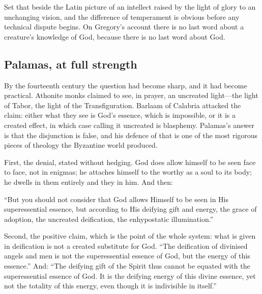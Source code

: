 Set that beside the Latin picture of an intellect raised by the light of glory to an unchanging vision, and the difference of temperament is obvious before any technical dispute begins. On Gregory's account there is no last word about a creature's knowledge of God, because there is no last word about God.

\subsection{Palamas, at full strength}

By the fourteenth century the question had become sharp, and it had become practical. Athonite monks claimed to see, in prayer, an uncreated light---the light of Tabor, the light of the Transfiguration. Barlaam of Calabria attacked the claim: either what they see is God's essence, which is impossible, or it is a created effect, in which case calling it uncreated is blasphemy. Palamas's answer is that the disjunction is false, and his defence of that is one of the most rigorous pieces of theology the Byzantine world produced.

First, the denial, stated without hedging. God does allow himself to be seen face to face, not in enigmas; he attaches himself to the worthy as a soul to its body; he dwells in them entirely and they in him. And then:

\begin{studyframe}
``But you should not consider that God allows Himself to be seen in His superessential essence, but according to His deifying gift and energy, the grace of adoption, the uncreated deification, the enhypostatic illumination.''
\end{studyframe}

Second, the positive claim, which is the point of the whole system: what is given in deification is not a created substitute for God. ``The deification of divinised angels and men is not the superessential essence of God, but the energy of this essence.'' And: ``The deifying gift of the Spirit thus cannot be equated with the superessential essence of God. It is the deifying energy of this divine essence, yet not the totality of this energy, even though it is indivisible in itself.''

